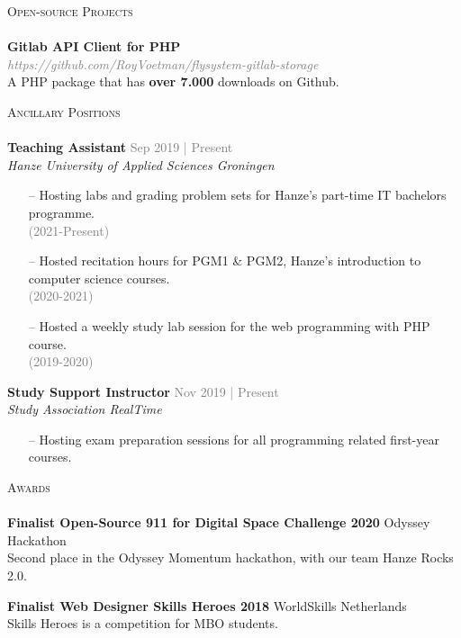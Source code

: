 \documentclass[a4paper]{article}
\newcommand{\lineunder} {
    \vspace*{-8pt} \\
    \hspace*{-18pt} \hrulefill \\
}
\newcommand{\header} [1] {
    {\hspace*{-18pt}\vspace*{6pt} \textsc{#1}}
    \vspace*{-6pt} \lineunder
}
\begin{document}
\vspace{5mm}

\header{Open-source Projects}
{\textbf{Gitlab API Client for PHP}} \\ \textcolor{gray}{\emph{https://github.com/RoyVoetman/flysystem-gitlab-storage}}\\
A PHP package that has \textbf{over 7.000} downloads on Github.
\vspace*{2mm}

\vspace{5mm}

\header{Ancillary Positions}
\vspace{1mm}
\textbf{Teaching Assistant} \hfill \textcolor{gray}{Sep 2019 | Present}\\
\textit{Hanze University of Applied Sciences Groningen}\\
\vspace{-2mm}
\begin{itemize} \itemsep 1pt
	\item[--] Hosting labs and grading problem sets for Hanze’s part-time IT bachelors programme.\\ \textcolor{gray}{(2021-Present)}
	\item[--] Hosted recitation hours for PGM1 \& PGM2, Hanze’s introduction to computer science courses.\\\textcolor{gray}{(2020-2021)}
	\item[--]Hosted a weekly study lab session for the web programming with PHP course.\\
		\textcolor{gray}{(2019-2020)}
\end{itemize}
\textbf{Study Support Instructor} \hfill \textcolor{gray}{Nov 2019 | Present}\\
\textit{Study Association RealTime}\\
\vspace{-2mm}
\begin{itemize} \itemsep 1pt
	\item[--] Hosting exam preparation sessions for all programming related first-year courses.
\end{itemize}

\vspace{2mm}

\vspace{5mm}

\header{Awards}
\textbf{Finalist Open-Source 911 for Digital Space Challenge 2020} \hfill Odyssey Hackathon\\
Second place in the Odyssey Momentum hackathon, with our team Hanze Rocks 2.0.
\vspace*{2mm}

\textbf{Finalist Web Designer Skills Heroes 2018} \hfill WorldSkills Netherlands\\
Skills Heroes is a competition for MBO students.
\vspace*{2mm}

\ 
\end{document}

